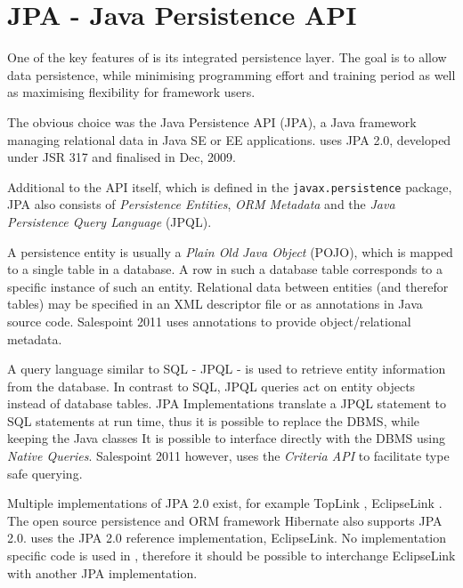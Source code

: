 \section{JPA - Java Persistence API}
One of the key features of \salespoint is its integrated persistence layer. The goal is to allow data persistence, while minimising programming effort and training period as well as maximising flexibility for framework users.

The obvious choice was the Java Persistence API (JPA), a Java framework managing relational data in Java SE or EE applications. \salespoint uses JPA 2.0, developed under JSR 317 and finalised in Dec, 2009.

Additional to the API itself, which is defined in the \texttt{javax.persistence} package, JPA also consists of \textit{Persistence Entities}, \textit{ORM Metadata} and the \textit{Java Persistence Query Language} (JPQL).

A persistence entity is usually a \textit{Plain Old Java Object} (POJO), which is mapped to a single table in a database.
A row in such a database table corresponds to a specific instance of such an entity.
Relational data between entities (and therefor tables) may be specified in an XML descriptor file or as annotations in Java source code.
Salespoint 2011 uses annotations to provide object/relational metadata.

A query language similar to SQL - JPQL - is used to retrieve entity information from the database.
In contrast to SQL, JPQL queries act on entity objects instead of database tables.
JPA Implementations translate a JPQL statement to SQL statements at run time, thus it is possible to replace the DBMS, while keeping the Java classes
It is possible to interface directly with the DBMS using \textit{Native Queries}.
Salespoint 2011 however, uses the \textit{Criteria API} to facilitate type safe querying.

Multiple implementations of JPA 2.0 exist, for example TopLink \cite{toplink}, EclipseLink \cite{eclipselink}.
The open source persistence and ORM framework Hibernate \cite{hibernate} also supports JPA 2.0.
\salespoint uses the JPA 2.0 reference implementation, EclipseLink.
No implementation specific code is used in \salespoint, therefore it should be possible to interchange EclipseLink with another JPA implementation.
